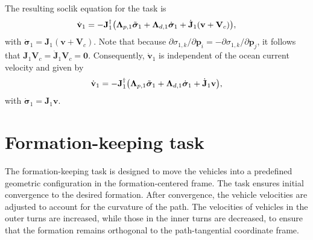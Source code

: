 The resulting \gls{soclik} equation for the task is
\begin{equation}
    \dot{\mathbf{v}}_1 = -\mathbf{J}_1^\dagger \bigl( \mathbf{\Lambda}_{p,1}\Tilde{\bm{\sigma}}_1 + \mathbf{\Lambda}_{d,1} \dot{\bm{\sigma}}_1 + \dot{\mathbf{J}}_1 (\mathbf{v}+\mathbf{V}_c)\bigl),
\end{equation}
with $\dot{\bm{\sigma}}_{1} = \mathbf{J}_1 (\mathbf{v} + \mathbf{V}_c)$. Note that because $ \partial \sigma_{1,k}/\partial \mathbf{p}_i = - \partial \sigma_{1,k}/\partial \mathbf{p}_j$, it follows that $\mathbf{J}_1 \mathbf{V}_{c} = \dot{\mathbf{J}}_1 \mathbf{V}_{c} = \mathbf{0}$. Consequently, $\dot{\mathbf{v}}_1$ is independent of the ocean current velocity and given by
\begin{equation}\label{eq:SOCLIK1}
    \dot{\mathbf{v}}_1 = -\mathbf{J}_1^\dagger \bigl( \mathbf{\Lambda}_{p,1}\Tilde{\bm{\sigma}}_1 + \mathbf{\Lambda}_{d,1} \dot{\bm{\sigma}}_1 + \dot{\mathbf{J}}_1 \mathbf{v}\bigl),
\end{equation}
with $\dot{\bm{\sigma}}_{1} = \mathbf{J}_1 \mathbf{v}$.


\section{Formation-keeping task}\label{sec:formation_keeping}
The formation-keeping task is designed to move the vehicles into a predefined geometric configuration in the formation-centered frame. The task ensures initial convergence to the desired formation.  After convergence, the vehicle velocities are adjusted to account for the curvature of the path. The velocities of vehicles in the outer turns are increased, while those in the inner turns are decreased, to ensure that the formation remains orthogonal to the path-tangential coordinate frame.

